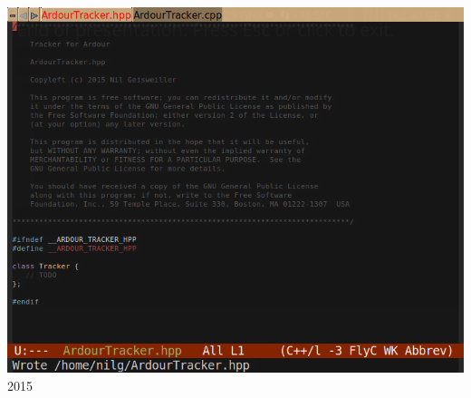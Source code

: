 \documentclass{beamer}
\begin{document}
\begin{frame}
  \begin{center}
    \includegraphics[scale=0.3475]{images/ardour-tracker.png}\\
    2015
  \end{center}
\end{frame}
\end{document}
